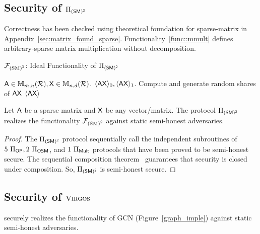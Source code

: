 \subsection{Security of 
\texorpdfstring{$\Pi_{\mathsf{(SM)^2}}$}{π(SM)2}
}
Correctness has been checked using theoretical foundation for sparse-matrix in Appendix~\ref{sec:matrix_found_sparse}.
Functionality~\ref{func::mmult} defines arbitrary-sparse matrix multiplication without %
decomposition.


\begin{functionality}[!t]
	\caption{$\mathcal{F}_{\text{\textnormal{(SM)$^2$}}}$: Ideal Functionality of $\Pi_{\mathsf{(SM)^2}}$}\label{func::mmult}
\begin{algorithmic}[1]
	\REQUIRE $\mathsf{A}\in \mathbb{M}_{m,n}(\mathcal{R}), \mathsf{X}\in \mathbb{M}_{n,d}(\mathcal{R})$.
	\ENSURE $\langle \mathsf{A}\mathsf{X} \rangle_0, \langle \mathsf{A}\mathsf{X} \rangle_1$.
	\STATE Compute and generate random shares of $\mathsf{A}\mathsf{X}$
	\RETURN $\langle \mathsf{A}\mathsf{X} \rangle$
\end{algorithmic}
\end{functionality}


\begin{theorem}
\label{secthe::smm}
Let $\mathsf{A}$ be a sparse %
matrix and $\mathsf{X}$ be any vector/matrix.
The protocol $\Pi_{\mathsf{(SM)^2}}$ realizes the functionality $\mathcal{F}_{\text{\textnormal{(SM)$^2$}}}$ %
against static semi-honest adversaries.
\end{theorem}


\begin{proof}
The $\Pi_{\mathsf{(SM)^2}}$ protocol sequentially call the independent subroutines of $5\ {\Pi}_{\mathsf{OP}}, 2\ \Pi_{\mathsf{OSM}}$, and $1\ \Pi_{\mathsf{Mult}}$ protocols that have been proved to be semi-honest secure.
The sequential composition theorem~\cite{joc/Canetti00} guarantees that security is closed under composition.
So, $\Pi_{\mathsf{(SM)^2}}$ is semi-honest secure.
\end{proof}
 
\subsection{Security of 
\texorpdfstring{$\textnormal{\textsc{Virgos}}$}{\textcgnn}
}

\begin{theorem}
\label{secthe::sec_swan}
\cgnn securely realizes the functionality of GCN (Figure~\ref{graph_imple}) against static semi-honest adversaries.
\end{theorem}

